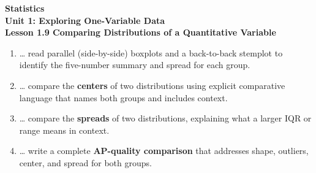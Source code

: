 \documentclass[10pt]{article}
\begin{document}
\vspace{-0.8in}

\begin{center}
  {\color{white}\textbf{\LARGE Statistics}}\\[4pt]
  {\color{skymid}\large\textbf{Unit 1: Exploring One-Variable Data}}\\[6pt]
  {\color{white}\textbf{\large Lesson 1.9 \quad Comparing Distributions of a Quantitative Variable}}
\end{center}

\vspace{0.22in}

\namedateperiod

\vspace{0.18in}

\begin{learningtargetbox}
\small
\begin{enumerate}[leftmargin=1.5em, itemsep=5pt]
  \item \ldots{} read parallel (side-by-side) boxplots and a back-to-back stemplot
        to identify the five-number summary and spread for each group.
  \item \ldots{} compare the \textbf{centers} of two distributions using explicit
        comparative language that names both groups and includes context.
  \item \ldots{} compare the \textbf{spreads} of two distributions, explaining what
        a larger IQR or range means in context.
  \item \ldots{} write a complete \textbf{AP-quality comparison} that addresses
        shape, outliers, center, and spread for both groups.
\end{enumerate}
\end{learningtargetbox}

\vspace{0.14in}
\end{document}
